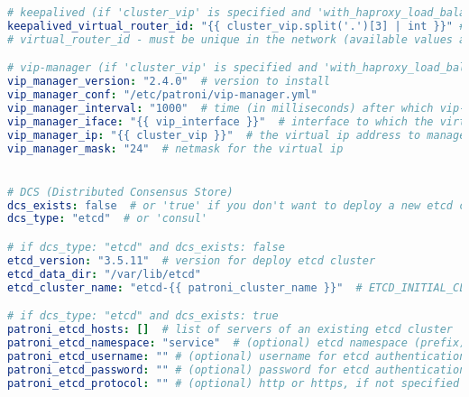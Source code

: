 \begin{flushleft}
\begin{lstlisting}[language=yaml, caption=Testsystem - Anhang - Maintenance - main.yml,captionpos=b,label={lst:testsystem-maintenance-main.yml},breaklines=true]
# keepalived (if 'cluster_vip' is specified and 'with_haproxy_load_balancing' is 'true')
keepalived_virtual_router_id: "{{ cluster_vip.split('.')[3] | int }}" # The last octet of 'cluster_vip' IP address is used by default.
# virtual_router_id - must be unique in the network (available values are 0..255).

# vip-manager (if 'cluster_vip' is specified and 'with_haproxy_load_balancing' is 'false')
vip_manager_version: "2.4.0"  # version to install
vip_manager_conf: "/etc/patroni/vip-manager.yml"
vip_manager_interval: "1000"  # time (in milliseconds) after which vip-manager wakes up and checks if it needs to register or release ip addresses.
vip_manager_iface: "{{ vip_interface }}"  # interface to which the virtual ip will be added
vip_manager_ip: "{{ cluster_vip }}"  # the virtual ip address to manage
vip_manager_mask: "24"  # netmask for the virtual ip


# DCS (Distributed Consensus Store)
dcs_exists: false  # or 'true' if you don't want to deploy a new etcd cluster
dcs_type: "etcd"  # or 'consul'

# if dcs_type: "etcd" and dcs_exists: false
etcd_version: "3.5.11"  # version for deploy etcd cluster
etcd_data_dir: "/var/lib/etcd"
etcd_cluster_name: "etcd-{{ patroni_cluster_name }}"  # ETCD_INITIAL_CLUSTER_TOKEN

# if dcs_type: "etcd" and dcs_exists: true
patroni_etcd_hosts: []  # list of servers of an existing etcd cluster
patroni_etcd_namespace: "service"  # (optional) etcd namespace (prefix)
patroni_etcd_username: "" # (optional) username for etcd authentication
patroni_etcd_password: "" # (optional) password for etcd authentication
patroni_etcd_protocol: "" # (optional) http or https, if not specified http is used


\end{lstlisting}
\end{flushleft}
